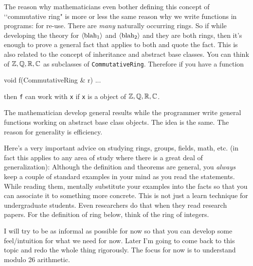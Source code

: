 The reason why mathematicians even bother defining this concept
of \lq\lq commutative ring"
is more or less
the same reason why we write functions in programs: for re-use.
There are \textit{many} naturally occurring rings.
So if while developing the theory for 
${\langle \operatorname{blah_1} \rangle}$
and
${\langle \operatorname{blah_2} \rangle}$
and they are both rings, then it's enough to prove a general fact that applies
to both and quote the fact.
This is also related to the concept of inheritance and abstract base classes.
You can think of $\mathbb Z, \mathbb Q, \mathbb R, \mathbb C$ as subclasses of \verb!CommutativeRing!.
Therefore if you have a function
\begin{console}
void f(CommutativeRing & r)
{
  ...
}
\end{console}
then \verb!f! can work with \verb!x! if \verb!x! is a object of $\mathbb Z, \mathbb Q, \mathbb R, \mathbb C$.

The mathematician develop  general results while the programmer
write general functions working on abstract base class objects.
The idea is the same.
The reason for generality is efficiency.

Here's a very important advice on studying rings, groups, fields, math, etc.
(in fact this applies to any area of study where there is a great deal of 
generalization):
Although the definition and theorems are general, you
\textit{always} keep a
couple of standard examples in your mind as you read the statements.
While reading them, mentally substitute your examples into the facts so that 
you can associate it to something more concrete.
This is not just a learn technique for undergraduate students.
Even researchers do that when they read research papers.
For the definition of ring below, think of the ring of integers.

I will try to be as informal as possible for now
so that you can develop some feel/intuition for what we need for now.
Later I'm going to come back to this topic and redo the whole thing rigorously.
The focus for now is to understand modulo 26 arithmetic.

